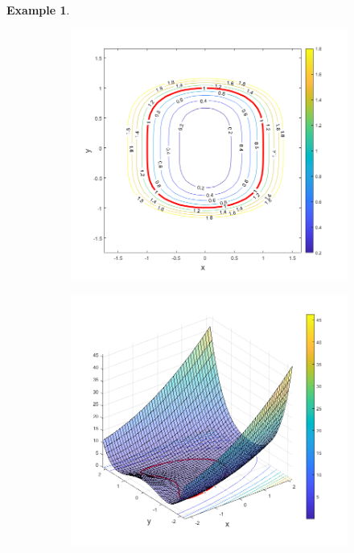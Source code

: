 \documentclass[11pt]{article}
\newtheorem{example}{Example}
\begin{document}
\begin{example}
\begin{figure}[!htb]
\begin{subfigure}{0.5\textwidth}
    \includegraphics[scale=0.45]{non_convex_SP_levelsets.png}
    \end{subfigure}%
    \hspace{-40pt}
    \begin{subfigure}{0.5\textwidth}
    \centering
    \includegraphics[scale=0.45]{non_convex_S.png}
    \vspace{-10pt}

\end{subfigure}
\end{figure}
\end{example}
\end{document}
